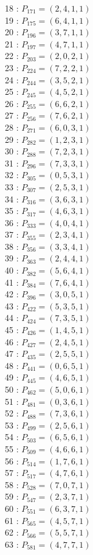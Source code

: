 \documentclass{article}
\begin{document}
{\begin{multicols}{2}
18 : $P_{171}=( 2, 4, 1, 1 )$\\
19 : $P_{175}=( 6, 4, 1, 1 )$\\
20 : $P_{196}=( 3, 7, 1, 1 )$\\
21 : $P_{197}=( 4, 7, 1, 1 )$\\
22 : $P_{203}=( 2, 0, 2, 1 )$\\
23 : $P_{224}=( 7, 2, 2, 1 )$\\
24 : $P_{244}=( 3, 5, 2, 1 )$\\
25 : $P_{245}=( 4, 5, 2, 1 )$\\
26 : $P_{255}=( 6, 6, 2, 1 )$\\
27 : $P_{256}=( 7, 6, 2, 1 )$\\
28 : $P_{271}=( 6, 0, 3, 1 )$\\
29 : $P_{282}=( 1, 2, 3, 1 )$\\
30 : $P_{288}=( 7, 2, 3, 1 )$\\
31 : $P_{296}=( 7, 3, 3, 1 )$\\
32 : $P_{305}=( 0, 5, 3, 1 )$\\
33 : $P_{307}=( 2, 5, 3, 1 )$\\
34 : $P_{316}=( 3, 6, 3, 1 )$\\
35 : $P_{317}=( 4, 6, 3, 1 )$\\
36 : $P_{333}=( 4, 0, 4, 1 )$\\
37 : $P_{355}=( 2, 3, 4, 1 )$\\
38 : $P_{356}=( 3, 3, 4, 1 )$\\
39 : $P_{363}=( 2, 4, 4, 1 )$\\
40 : $P_{382}=( 5, 6, 4, 1 )$\\
41 : $P_{384}=( 7, 6, 4, 1 )$\\
42 : $P_{396}=( 3, 0, 5, 1 )$\\
43 : $P_{422}=( 5, 3, 5, 1 )$\\
44 : $P_{424}=( 7, 3, 5, 1 )$\\
45 : $P_{426}=( 1, 4, 5, 1 )$\\
46 : $P_{427}=( 2, 4, 5, 1 )$\\
47 : $P_{435}=( 2, 5, 5, 1 )$\\
48 : $P_{441}=( 0, 6, 5, 1 )$\\
49 : $P_{445}=( 4, 6, 5, 1 )$\\
50 : $P_{462}=( 5, 0, 6, 1 )$\\
51 : $P_{481}=( 0, 3, 6, 1 )$\\
52 : $P_{488}=( 7, 3, 6, 1 )$\\
53 : $P_{499}=( 2, 5, 6, 1 )$\\
54 : $P_{503}=( 6, 5, 6, 1 )$\\
55 : $P_{509}=( 4, 6, 6, 1 )$\\
56 : $P_{514}=( 1, 7, 6, 1 )$\\
57 : $P_{517}=( 4, 7, 6, 1 )$\\
58 : $P_{528}=( 7, 0, 7, 1 )$\\
59 : $P_{547}=( 2, 3, 7, 1 )$\\
60 : $P_{551}=( 6, 3, 7, 1 )$\\
61 : $P_{565}=( 4, 5, 7, 1 )$\\
62 : $P_{566}=( 5, 5, 7, 1 )$\\
63 : $P_{581}=( 4, 7, 7, 1 )$\\
\end{multicols}
}
\end{document}
